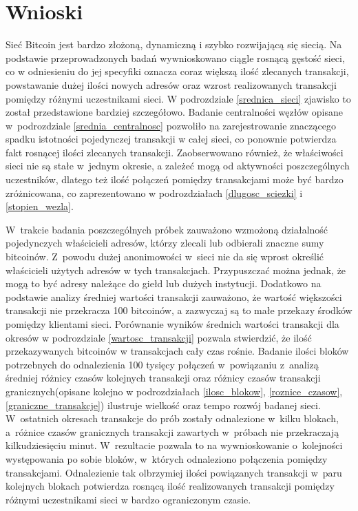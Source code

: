 \documentclass[12pt, twoside, final, openany]{mgr}
\begin{document}
\section{Wnioski}

Sieć Bitcoin jest bardzo złożoną, dynamiczną i szybko rozwijającą się siecią. Na podstawie przeprowadzonych badań wywnioskowano ciągle rosnącą gęstość sieci, co w odniesieniu do jej specyfiki oznacza coraz większą ilość zlecanych transakcji, powstawanie dużej ilości nowych adresów oraz wzrost realizowanych transakcji pomiędzy różnymi uczestnikami sieci. W podrozdziale \ref{srednica_sieci}  zjawisko to został przedstawione bardziej szczegółowo. Badanie centralności węzłów opisane w~podrozdziale \ref{srednia_centralnosc} pozwoliło na zarejestrowanie znaczącego spadku istotności pojedynczej transakcji w całej sieci, co ponownie potwierdza fakt rosnącej ilości zlecanych transakcji. Zaobserwowano również, że właściwości sieci nie są stałe w~jednym okresie, a zależeć mogą od aktywności poszczególnych uczestników, dlatego też ilość połączeń pomiędzy transakcjami może być bardzo zróżnicowana, co zaprezentowano w podrozdziałach \ref{dlugosc_sciezki} i \ref{stopien_wezla}. 

\indent W~trakcie badania poszczególnych próbek zauważono wzmożoną działalność  pojedynczych właścicieli adresów, którzy zlecali lub odbierali znaczne sumy bitcoinów. Z~powodu dużej anonimowości w~sieci nie da się wprost określić właścicieli użytych adresów w tych transakcjach. Przypuszczać można jednak, że mogą to być adresy należące do giełd lub dużych instytucji. Dodatkowo na podstawie analizy średniej wartości transakcji zauważono, że wartość większości transakcji nie przekracza 100 bitcoinów, a zazwyczaj są to małe przekazy środków pomiędzy klientami sieci. Porównanie wyników średnich wartości transakcji dla okresów w podrozdziale \ref{wartosc_transakcji} pozwala stwierdzić, że ilość przekazywanych bitcoinów w transakcjach cały czas rośnie. Badanie ilości bloków potrzebnych do odnalezienia 100 tysięcy połączeń w~powiązaniu z~analizą średniej różnicy czasów kolejnych transakcji oraz różnicy czasów transakcji granicznych(opisane kolejno w podrozdziałach \ref{ilosc_blokow}, \ref{roznice_czasow}, \ref{graniczne_transakcje}) ilustruje wielkość oraz tempo rozwój badanej sieci. W~ostatnich okresach transakcje do prób zostały odnalezione w~kilku blokach, a~różnice czasów granicznych transakcji zawartych w~próbach nie przekraczają kilkudziesięciu minut. W~rezultacie pozwala to na wywnioskowanie o~kolejności występowania po sobie bloków, w~których odnaleziono połączenia pomiędzy transakcjami. Odnalezienie tak olbrzymiej ilości powiązanych transakcji w~paru kolejnych blokach potwierdza rosnącą ilość realizowanych transakcji pomiędzy różnymi uczestnikami sieci w bardzo ograniczonym czasie.
\end{document}
